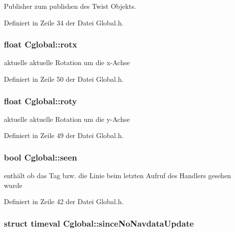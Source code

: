Publisher zum publishen des Twist Objekts. 



Definiert in Zeile 34 der Datei Global.h.

\hypertarget{class_cglobal_ad295728f5113d9a47527cf14262dea0e}{
\subsubsection[{rotx}]{\setlength{\rightskip}{0pt plus 5cm}float {\bf Cglobal::rotx}}}
\label{class_cglobal_ad295728f5113d9a47527cf14262dea0e}


aktuelle aktuelle Rotation um die x-\/Achse 



Definiert in Zeile 50 der Datei Global.h.

\hypertarget{class_cglobal_a5c1fac565d3813e798bd6aeb1c6fc8aa}{
\subsubsection[{roty}]{\setlength{\rightskip}{0pt plus 5cm}float {\bf Cglobal::roty}}}
\label{class_cglobal_a5c1fac565d3813e798bd6aeb1c6fc8aa}


aktuelle aktuelle Rotation um die y-\/Achse 



Definiert in Zeile 49 der Datei Global.h.

\hypertarget{class_cglobal_afe6f01a7ff64a3de6d0c8612f36511fd}{
\subsubsection[{seen}]{\setlength{\rightskip}{0pt plus 5cm}bool {\bf Cglobal::seen}}}
\label{class_cglobal_afe6f01a7ff64a3de6d0c8612f36511fd}


enthält ob das Tag bzw. die Linie beim letzten Aufruf des Handlers gesehen wurde 



Definiert in Zeile 42 der Datei Global.h.

\hypertarget{class_cglobal_a9a9df79aad0bb5db8880a83d2fb407e2}{
\subsubsection[{sinceNoNavdataUpdate}]{\setlength{\rightskip}{0pt plus 5cm}struct timeval {\bf Cglobal::sinceNoNavdataUpdate}}}
\label{class_cglobal_a9a9df79aad0bb5db8880a83d2fb407e2}


